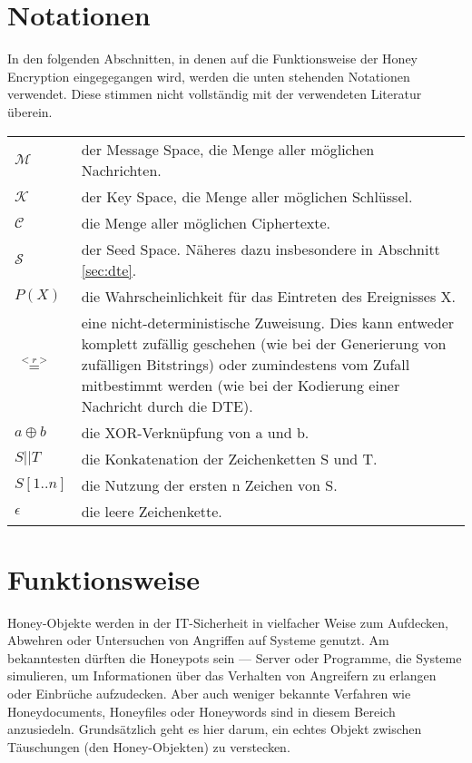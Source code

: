\section{Notationen}

In den folgenden Abschnitten, in denen auf die Funktionsweise der Honey Encryption eingegegangen wird, werden die unten stehenden Notationen verwendet. Diese stimmen nicht vollständig mit der verwendeten Literatur überein.

\begin{tabular}{lp{14cm}}
\(\mathcal{M}\) & der Message Space, die Menge aller möglichen Nachrichten. \\ 
\(\mathcal{K}\) & der Key Space, die Menge aller möglichen Schlüssel. \\ 
\(\mathcal{C}\) & die Menge aller möglichen Ciphertexte. \\ 
\(\mathcal{S}\) & der Seed Space. Näheres dazu insbesondere in Abschnitt \ref{sec:dte}. \\ 
\(P(X)\) & die Wahrscheinlichkeit für das Eintreten des Ereignisses X.\\ 
\(\overset{<r>}{=}\) & eine nicht-deterministische Zuweisung. Dies kann entweder komplett zufällig geschehen (wie bei der Generierung von zufälligen Bitstrings) oder zumindestens vom Zufall mitbestimmt werden (wie bei der Kodierung einer Nachricht durch die DTE). \\ 
\(a \oplus b\) & die XOR-Verknüpfung von a und b. \\ 
\(S || T\) & die Konkatenation der Zeichenketten S und T. \\ 
\(S{[1..n]}\) & die Nutzung der ersten n Zeichen von S. \\ 
\(\epsilon\) & die leere Zeichenkette. \\ 
\end{tabular}

\newpage

\section{Funktionsweise}
\label{sec:funktionsweise}

Honey-Objekte werden in der IT-Sicherheit in vielfacher Weise zum Aufdecken, Abwehren oder Untersuchen von Angriffen auf Systeme genutzt. Am bekanntesten dürften die Honeypots sein --- Server oder Programme, die Systeme simulieren, um Informationen über das Verhalten von Angreifern zu erlangen oder Einbrüche aufzudecken. Aber auch weniger bekannte Verfahren wie Honeydocuments, Honeyfiles oder Honeywords sind in diesem Bereich anzusiedeln. Grundsätzlich geht es hier darum, ein echtes Objekt zwischen Täuschungen (den Honey-Objekten) zu verstecken. 


